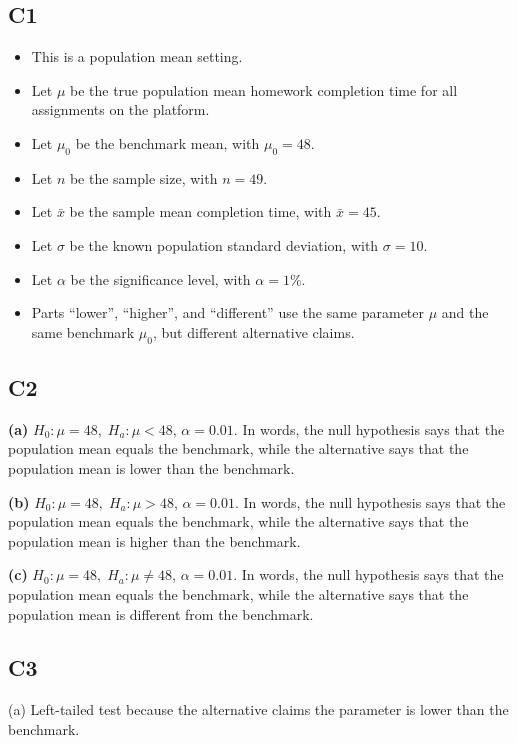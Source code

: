 \begin{ExamProblems}
		\subsection*{C1}
		\begin{itemize}
			\item This is a population mean setting.
			\item Let \(\mu\) be the true population mean homework completion time for all assignments on the platform.
			\item Let \(\mu_0\) be the benchmark mean, with \(\mu_0=48\).
			\item Let \(n\) be the sample size, with \(n=49\).
			\item Let \(\bar{x}\) be the sample mean completion time, with \(\bar{x}=45\).
			\item Let \(\sigma\) be the known population standard deviation, with \(\sigma=10\).
			\item Let \(\alpha\) be the significance level, with \(\alpha=1\%\).
			\item Parts ``lower'', ``higher'', and ``different'' use the same parameter \(\mu\) and the same benchmark \(\mu_0\), but different alternative claims.
		\end{itemize}
		
		\subsection*{C2}
		\textbf{(a)} \(H_0\colon \mu=48,\; H_a\colon \mu<48\), \(\alpha=0.01\). In words, the null hypothesis says that the population mean equals the benchmark, while the alternative says that the population mean is lower than the benchmark.
		
		\textbf{(b)} \(H_0\colon \mu=48,\; H_a\colon \mu>48\), \(\alpha=0.01\). In words, the null hypothesis says that the population mean equals the benchmark, while the alternative says that the population mean is higher than the benchmark.
		
		\textbf{(c)} \(H_0\colon \mu=48,\; H_a\colon \mu\ne 48\), \(\alpha=0.01\). In words, the null hypothesis says that the population mean equals the benchmark, while the alternative says that the population mean is different from the benchmark.
		
		\subsection*{C3}
		(a) Left-tailed test because the alternative claims the parameter is lower than the benchmark.\LeftTailGraph
		

\end{ExamProblems}
